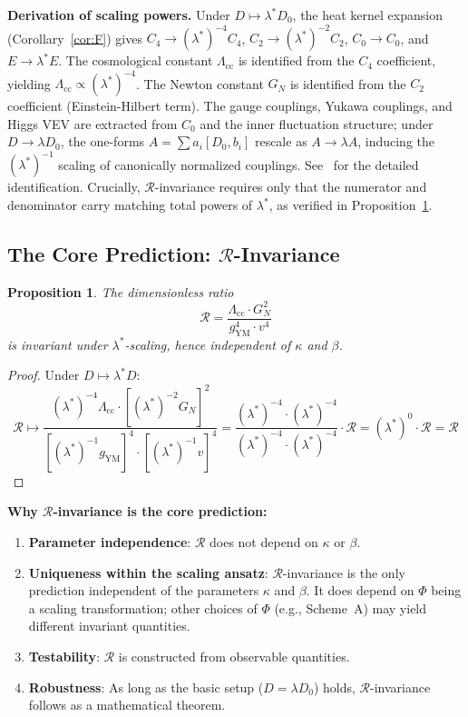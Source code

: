 \documentclass[11pt,a4paper]{article}
\newtheorem{proposition}[theorem]{Proposition}
\theoremstyle{remark}
\newcommand{\R}{\mathcal{R}}
\newcommand{\Lcc}{\Lambda_{\mathrm{cc}}}
\newcommand{\GN}{G_N}
\newcommand{\gYM}{g_{\mathrm{YM}}}
\begin{document}
\textbf{Derivation of scaling powers.} Under $D \mapsto \lambda^* D_0$, the heat kernel expansion (Corollary~\ref{cor:F}) gives $C_4 \to (\lambda^*)^{-4} C_4$, $C_2 \to (\lambda^*)^{-2} C_2$, $C_0 \to C_0$, and $E \to \lambda^* E$. The cosmological constant $\Lcc$ is identified from the $C_4$ coefficient, yielding $\Lcc \propto (\lambda^*)^{-4}$. The Newton constant $\GN$ is identified from the $C_2$ coefficient (Einstein-Hilbert term). The gauge couplings, Yukawa couplings, and Higgs VEV are extracted from $C_0$ and the inner fluctuation structure; under $D \to \lambda D_0$, the one-forms $A = \sum a_i[D_0, b_i]$ rescale as $A \to \lambda A$, inducing the $(\lambda^*)^{-1}$ scaling of canonically normalized couplings. See~\cite{CCM06} for the detailed identification. Crucially, $\R$-invariance requires only that the numerator and denominator carry matching total powers of $\lambda^*$, as verified in Proposition~\ref{prop:R}.

\subsection{The Core Prediction: $\R$-Invariance}

\begin{proposition}
\label{prop:R}
The dimensionless ratio
\[
  \R = \frac{\Lcc \cdot \GN^2}{\gYM^4 \cdot v^4}
\]
is invariant under $\lambda^*$-scaling, hence independent of $\kappa$ and $\beta$.
\end{proposition}

\begin{proof}
Under $D \mapsto \lambda^* D$:
\[
  \R \mapsto \frac{(\lambda^*)^{-4} \Lcc \cdot [(\lambda^*)^{-2} \GN]^2}{[(\lambda^*)^{-1} \gYM]^4 \cdot [(\lambda^*)^{-1} v]^4} = \frac{(\lambda^*)^{-4} \cdot (\lambda^*)^{-4}}{(\lambda^*)^{-4} \cdot (\lambda^*)^{-4}} \cdot \R = (\lambda^*)^0 \cdot \R = \R
\]
\end{proof}

\textbf{Why $\R$-invariance is the core prediction:}
\begin{enumerate}
  \item \textbf{Parameter independence}: $\R$ does not depend on $\kappa$ or $\beta$.
  \item \textbf{Uniqueness within the scaling ansatz}: $\R$-invariance is the only prediction independent of the parameters $\kappa$ and $\beta$. It does depend on $\Phi$ being a scaling transformation; other choices of $\Phi$ (e.g., Scheme~A) may yield different invariant quantities.
  \item \textbf{Testability}: $\R$ is constructed from observable quantities.
  \item \textbf{Robustness}: As long as the basic setup ($D = \lambda D_0$) holds, $\R$-invariance follows as a mathematical theorem.
\end{enumerate}
\end{document}
